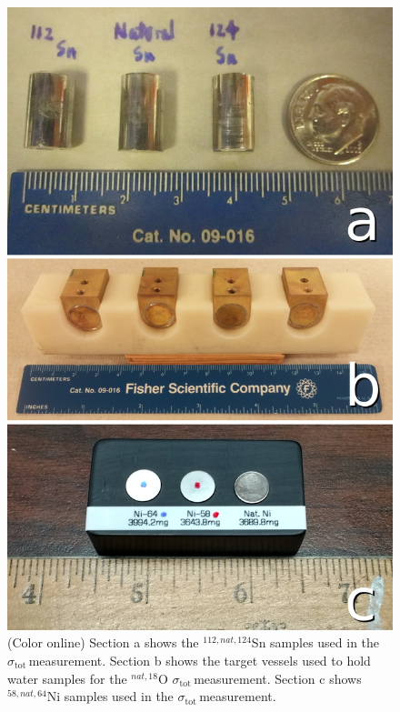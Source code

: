 \documentclass[twocolumn,secnumarabic,amssymb, nobibnotes, aps, prl,
superscriptaddress, nobalancelastpage]{revtex4}
\newcommand{\tots}{\ensuremath{\sigma_{\text{tot}}\,}}
\begin{document}
\begin{figure}
    \includegraphics[scale=0.23]{figures/AllIsotopicSamples.jpg}
    \caption{(Color online) Section a shows the ${^{112,nat,124}}$Sn samples used in
        the \tots measurement. Section b shows the target vessels used to hold
        water samples for the ${^{nat, 18}}$O \tots measurement. Section c shows
    ${^{58,nat,64}}$Ni samples used in the \tots measurement.}
    \label{SamplesImage}
\end{figure}
\end{document}
